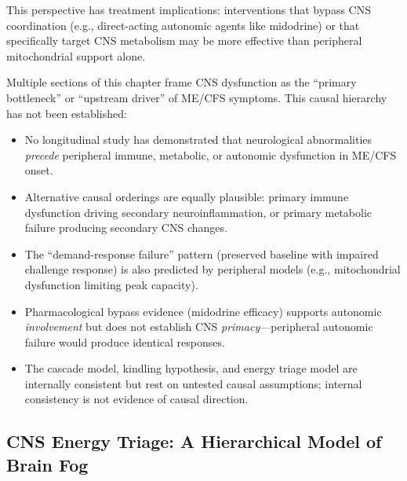 This perspective has treatment implications: interventions that bypass CNS coordination (e.g., direct-acting autonomic agents like midodrine) or that specifically target CNS metabolism may be more effective than peripheral mitochondrial support alone.

\begin{limitation}
Multiple sections of this chapter frame CNS dysfunction as the ``primary bottleneck'' or ``upstream driver'' of ME/CFS symptoms. This causal hierarchy has not been established:
\begin{itemize}
    \item No longitudinal study has demonstrated that neurological abnormalities \emph{precede} peripheral immune, metabolic, or autonomic dysfunction in ME/CFS onset.
    \item Alternative causal orderings are equally plausible: primary immune dysfunction driving secondary neuroinflammation, or primary metabolic failure producing secondary CNS changes.
    \item The ``demand-response failure'' pattern (preserved baseline with impaired challenge response) is also predicted by peripheral models (e.g., mitochondrial dysfunction limiting peak capacity).
    \item Pharmacological bypass evidence (midodrine efficacy) supports autonomic \emph{involvement} but does not establish CNS \emph{primacy}---peripheral autonomic failure would produce identical responses.
    \item The cascade model, kindling hypothesis, and energy triage model are internally consistent but rest on untested causal assumptions; internal consistency is not evidence of causal direction.
\end{itemize}
\end{limitation}

\subsection{CNS Energy Triage: A Hierarchical Model of Brain Fog}
\label{sec:cns-energy-triage-clinical}


